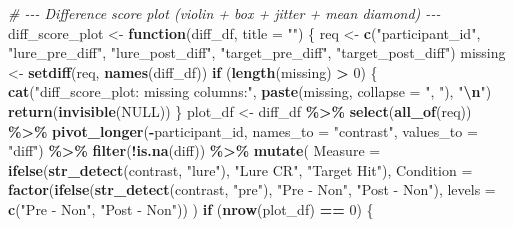 \documentclass[
]{article}
\newenvironment{Shaded}{\begin{snugshade}}{\end{snugshade}}
\newcommand{\AttributeTok}[1]{\textcolor[rgb]{0.13,0.29,0.53}{#1}}
\newcommand{\CommentTok}[1]{\textcolor[rgb]{0.56,0.35,0.01}{\textit{#1}}}
\newcommand{\ConstantTok}[1]{\textcolor[rgb]{0.56,0.35,0.01}{#1}}
\newcommand{\ControlFlowTok}[1]{\textcolor[rgb]{0.13,0.29,0.53}{\textbf{#1}}}
\newcommand{\DecValTok}[1]{\textcolor[rgb]{0.00,0.00,0.81}{#1}}
\newcommand{\FunctionTok}[1]{\textcolor[rgb]{0.13,0.29,0.53}{\textbf{#1}}}
\newcommand{\NormalTok}[1]{#1}
\newcommand{\OtherTok}[1]{\textcolor[rgb]{0.56,0.35,0.01}{#1}}
\newcommand{\SpecialCharTok}[1]{\textcolor[rgb]{0.81,0.36,0.00}{\textbf{#1}}}
\newcommand{\StringTok}[1]{\textcolor[rgb]{0.31,0.60,0.02}{#1}}
\begin{document}
\begin{Shaded}
\begin{Highlighting}[]
\CommentTok{\# {-}{-}{-} Difference score plot (violin + box + jitter + mean diamond) {-}{-}{-}}
\NormalTok{diff\_score\_plot }\OtherTok{\textless{}{-}} \ControlFlowTok{function}\NormalTok{(diff\_df, }\AttributeTok{title =} \StringTok{""}\NormalTok{) \{}
\NormalTok{  req }\OtherTok{\textless{}{-}} \FunctionTok{c}\NormalTok{(}\StringTok{"participant\_id"}\NormalTok{, }\StringTok{"lure\_pre\_diff"}\NormalTok{, }\StringTok{"lure\_post\_diff"}\NormalTok{,}
           \StringTok{"target\_pre\_diff"}\NormalTok{, }\StringTok{"target\_post\_diff"}\NormalTok{)}
\NormalTok{  missing }\OtherTok{\textless{}{-}} \FunctionTok{setdiff}\NormalTok{(req, }\FunctionTok{names}\NormalTok{(diff\_df))}
  \ControlFlowTok{if}\NormalTok{ (}\FunctionTok{length}\NormalTok{(missing) }\SpecialCharTok{\textgreater{}} \DecValTok{0}\NormalTok{) \{}
    \FunctionTok{cat}\NormalTok{(}\StringTok{"diff\_score\_plot: missing columns:"}\NormalTok{, }\FunctionTok{paste}\NormalTok{(missing, }\AttributeTok{collapse =} \StringTok{", "}\NormalTok{), }\StringTok{"}\SpecialCharTok{\textbackslash{}n}\StringTok{"}\NormalTok{)}
    \FunctionTok{return}\NormalTok{(}\FunctionTok{invisible}\NormalTok{(}\ConstantTok{NULL}\NormalTok{))}
\NormalTok{  \}}
\NormalTok{  plot\_df }\OtherTok{\textless{}{-}}\NormalTok{ diff\_df }\SpecialCharTok{\%\textgreater{}\%}
    \FunctionTok{select}\NormalTok{(}\FunctionTok{all\_of}\NormalTok{(req)) }\SpecialCharTok{\%\textgreater{}\%}
    \FunctionTok{pivot\_longer}\NormalTok{(}\SpecialCharTok{{-}}\NormalTok{participant\_id, }\AttributeTok{names\_to =} \StringTok{"contrast"}\NormalTok{, }\AttributeTok{values\_to =} \StringTok{"diff"}\NormalTok{) }\SpecialCharTok{\%\textgreater{}\%}
    \FunctionTok{filter}\NormalTok{(}\SpecialCharTok{!}\FunctionTok{is.na}\NormalTok{(diff)) }\SpecialCharTok{\%\textgreater{}\%}
    \FunctionTok{mutate}\NormalTok{(}
      \AttributeTok{Measure   =} \FunctionTok{ifelse}\NormalTok{(}\FunctionTok{str\_detect}\NormalTok{(contrast, }\StringTok{"lure"}\NormalTok{), }\StringTok{"Lure CR"}\NormalTok{, }\StringTok{"Target Hit"}\NormalTok{),}
      \AttributeTok{Condition =} \FunctionTok{factor}\NormalTok{(}\FunctionTok{ifelse}\NormalTok{(}\FunctionTok{str\_detect}\NormalTok{(contrast, }\StringTok{"pre"}\NormalTok{), }\StringTok{"Pre {-} Non"}\NormalTok{, }\StringTok{"Post {-} Non"}\NormalTok{),}
                         \AttributeTok{levels =} \FunctionTok{c}\NormalTok{(}\StringTok{"Pre {-} Non"}\NormalTok{, }\StringTok{"Post {-} Non"}\NormalTok{))}
\NormalTok{    )}
  \ControlFlowTok{if}\NormalTok{ (}\FunctionTok{nrow}\NormalTok{(plot\_df) }\SpecialCharTok{==} \DecValTok{0}\NormalTok{) \{}

\end{Highlighting}
\end{Shaded}
\end{document}
